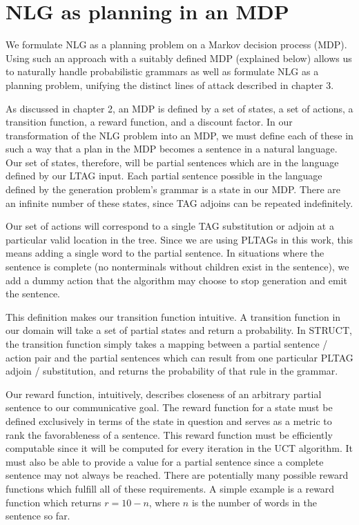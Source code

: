 \section{NLG as planning in an MDP}
We formulate NLG as a planning problem on a Markov decision process
(MDP).  Using such an approach with a suitably defined MDP
(explained below) allows us to naturally handle
probabilistic grammars as well as formulate NLG as a planning problem,
unifying the distinct lines of attack described in chapter 3.

As discussed in chapter 2, an MDP is defined by a set of states, a set of
actions, a transition function, a reward function, and a discount factor.
In our transformation of the NLG problem into an MDP, we must define
each of these in such a way that a plan in the MDP becomes a sentence
in a natural language.  Our set of states, therefore, will be partial
sentences which are in the language defined by our LTAG input.
Each partial sentence possible in the language defined by
the generation problem's grammar is a state in our MDP.  There are
an infinite number of these states, since TAG adjoins can be
repeated indefinitely.

Our set of actions will correspond to a single
TAG substitution or adjoin at a particular valid location in the tree.
Since we are using PLTAGs in this work,
this means adding a single word to the partial sentence.
In situations where the sentence is complete (no nonterminals without
children exist in the sentence),
we add a dummy action that the algorithm may choose 
to stop generation and emit the sentence.

This definition makes our transition function intuitive.  A transition
function in our domain will take a set of partial states and return
a probability.  In STRUCT, the transition function simply takes a
mapping between a partial sentence / action pair and the partial
sentences which can result from one particular PLTAG adjoin / substitution,
and returns the probability of that rule in the grammar.

Our reward function, intuitively, describes closeness of an arbitrary
partial sentence to our communicative
goal.  The reward function for a state must be defined exclusively in terms
 of the state in question and serves as a metric to
 rank the favorableness of a sentence.  This reward function must be
 efficiently computable since it will be computed for every iteration
 in the UCT algorithm.  It must also be able to provide a value for a
 partial sentence since a complete sentence
 may not always be reached.  There are potentially many
possible reward functions which fulfill all of these requirements.
A simple example is a reward function which returns $r = 10 - n$, where
$n$ is the number of words in the sentence so far.

